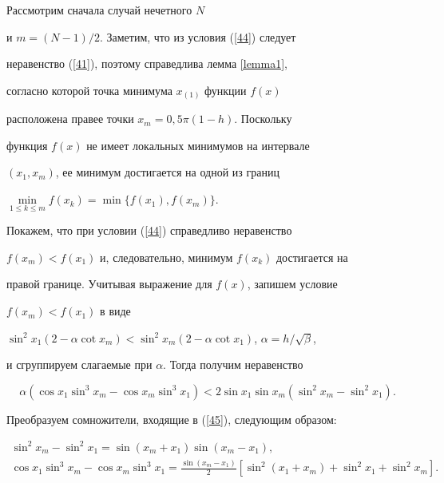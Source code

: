 \begin{pf}


Рассмотрим сначала случай нечетного $N$


и $m=(N-1)/2$. Заметим, что из условия (\ref{44}) следует


неравенство (\ref{41}), поэтому справедлива лемма \ref{lemma1},


согласно которой точка минимума $x_{(1)} $ функции $f(x)$


расположена правее точки $x_m=0{,}5\pi (1-h)$. Поскольку


функция $f(x)$ не имеет локальных минимумов на интервале 


$(x_1,x_m)$, ее минимум достигается на одной из границ


$\min\limits_{1 \leqslant k \leqslant m} f(x_k)=\min


\{f(x_1),f(x_m)\}$.


Покажем, что при условии (\ref{44}) справедливо неравенство 


$f(x_m) < f(x_1)$ и, следовательно, минимум $f(x_k)$ достигается на


правой границе. Учитывая выражение для $f(x)$, запишем условие


$f(x_m) < f(x_1)$ в виде


$\sin ^2 x_1 ({2-\alpha \cot x_m}) < \sin ^2 x_m


({2-\alpha \cot x_1})$, $\alpha=h/\sqrt\beta$,


и сгруппируем слагаемые при $\alpha $. Тогда получим неравенство


\begin{equation}\label{45}


\alpha (\cos x_1 \sin ^3 x_m-\cos x_m \sin ^3 x_1) < 2\sin x_1


\sin x_m (\sin ^2 x_m-\sin ^2 x_1).


\end{equation}


Преобразуем сомножители, входящие в (\ref{45}), следующим образом:


\begin{gather*}


\sin ^2 x_m-\sin ^2 x_1=\sin (x_m+x_1)\sin (x_m-x_1),\\


%


\cos x_1 \sin ^3 x_m-\cos x_m \sin ^3 x_1=\frac{{\sin (x_m -


x_1)}} {2}[ {\sin ^2 (x_1+x_m)+\sin ^2 x_1+\sin ^2x_m}].


\end{gather*}



\end{pf}
